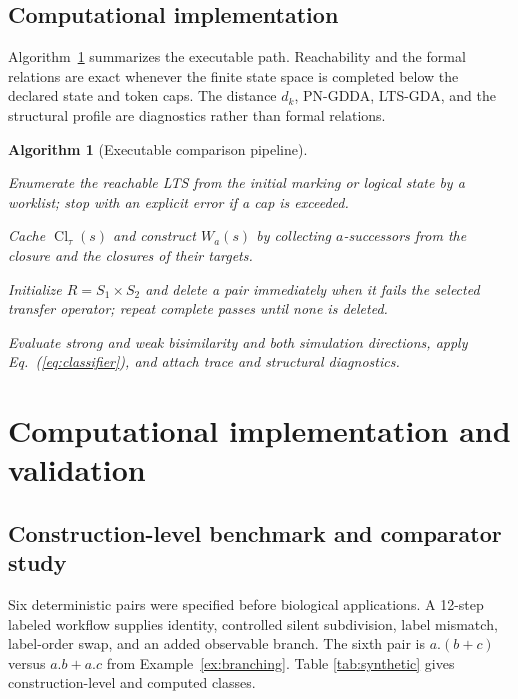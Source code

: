 \documentclass{ws-jbcb}
\newtheorem{algorithm}{Algorithm}
\numberwithin{equation}{section}
\newcommand{\TAU}{\tau}
\begin{document}
\subsection{Computational implementation}\label{sec:algorithms}

Algorithm~\ref{alg:pipeline} summarizes the executable path. Reachability and
the formal relations are exact whenever the finite state space is completed
below the declared state and token caps. The distance $d_k$, PN-GDDA, LTS-GDA,
and the structural profile are diagnostics rather than formal relations.

\begin{algorithm}[Executable comparison pipeline]\label{alg:pipeline}
\begin{romanlist}[(iv)]
\item Enumerate the reachable LTS from the initial marking or logical state by a
worklist; stop with an explicit error if a cap is exceeded.
\item Cache $\operatorname{Cl}_{\TAU}(s)$ and construct $W_a(s)$ by collecting
$a$-successors from the closure and the closures of their targets.
\item Initialize $R=S_1\times S_2$ and delete a pair immediately when it fails
the selected transfer operator; repeat complete passes until none is deleted.
\item Evaluate strong and weak bisimilarity and both simulation directions,
apply Eq.~(\ref{eq:classifier}), and attach trace and structural diagnostics.
\end{romanlist}
\end{algorithm}

\section{Computational implementation and validation}
\label{sec:computational-validation}

\subsection{Construction-level benchmark and comparator study}
\label{sec:benchmark-method}

Six deterministic pairs were specified before biological applications. A
12-step labeled workflow supplies identity, controlled silent subdivision, label
mismatch, label-order swap, and an added observable branch. The sixth pair is
$a.(b+c)$ versus $a.b+a.c$ from Example~\ref{ex:branching}. Table
\ref{tab:synthetic} gives construction-level and computed classes.
\end{document}
